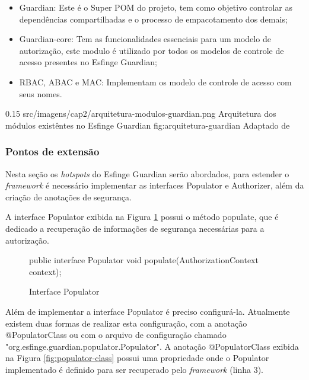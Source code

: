 \begin{itemize}
    \item Guardian: Este é o Super POM  do projeto, tem como objetivo controlar as dependências compartilhadas e o processo de empacotamento dos demais;
    
    \item Guardian-core: Tem as funcionalidades essenciais para um modelo de autorização, este modulo é utilizado por todos os modelos de controle de acesso presentes no Esfinge Guardian;
    
    \item RBAC, ABAC e MAC: Implementam os modelo de controle de acesso com seus nomes.
 
\end{itemize}

\begin{image}
{0.15} %
{src/imagens/cap2/arquitetura-modulos-guardian.png} %
{Arquitetura dos módulos existêntes no Esfinge Guardian} %
{fig:arquitetura-guardian} %
{Adaptado de } %
\end{image}

\subsubsection{Pontos de extensão}

\par Nesta seção os \textit{hotspots} do Esfinge Guardian serão abordados, para estender o \textit{framework} é necessário implementar as interfaces Populator e Authorizer, além da criação de anotações de segurança.

\par A interface Populator exibida na Figura \ref{fig:interface-populator} possui o método populate, que é dedicado a recuperação de informações de segurança necessárias para a autorização. 

\begin{figure}[H]
    \centering
    \caption{Interface Populator}
    \begin{java}
public interface Populator {
	void populate(AuthorizationContext context);
}
    \end{java}
    \label{fig:interface-populator}
\end{figure}

\par Além de implementar a interface Populator é preciso configurá-la. Atualmente existem duas formas de realizar esta configuração, com a anotação @PopulatorClass ou com o arquivo de configuração chamado "org.esfinge.guardian.populator.Populator". A anotação @PopulatorClass exibida na Figura \ref{fig:populator-class} possui uma propriedade onde o Populator implementado é definido para ser recuperado pelo \textit{framework} (linha 3).

